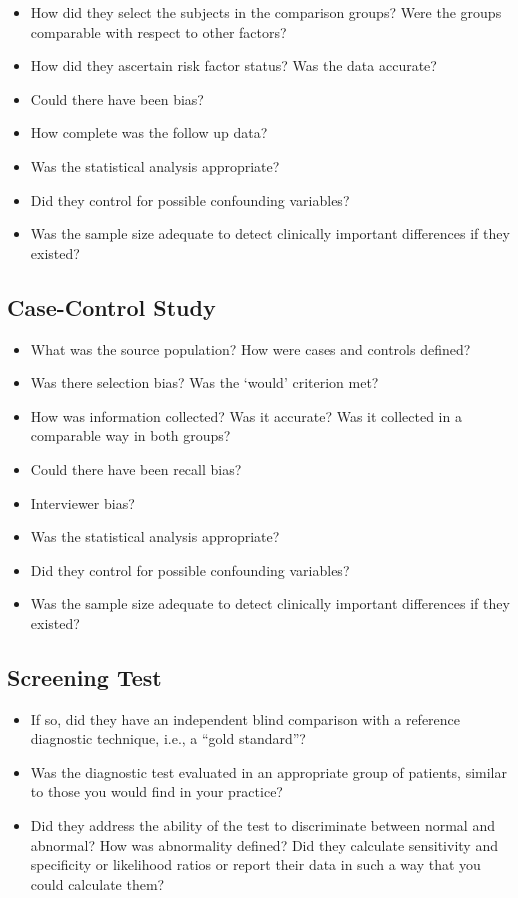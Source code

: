 \documentclass[
]{book}
\providecommand{\tightlist}{%
  \setlength{\itemsep}{0pt}\setlength{\parskip}{0pt}}
\begin{document}
\begin{itemize}
\tightlist
\item
  How did they select the subjects in the comparison groups? Were the groups comparable with respect to other factors?
\item
  How did they ascertain risk factor status? Was the data accurate?
\item
  Could there have been bias?
\item
  How complete was the follow up data?
\item
  Was the statistical analysis appropriate?
\item
  Did they control for possible confounding variables?
\item
  Was the sample size adequate to detect clinically important differences if they existed?
\end{itemize}

\hypertarget{case-control-study}{%
\subsection{Case-Control Study}\label{case-control-study}}

\begin{itemize}
\tightlist
\item
  What was the source population? How were cases and controls defined?
\item
  Was there selection bias? Was the `would' criterion met?
\item
  How was information collected? Was it accurate? Was it collected in a comparable way in both groups?
\item
  Could there have been recall bias?
\item
  Interviewer bias?
\item
  Was the statistical analysis appropriate?
\item
  Did they control for possible confounding variables?
\item
  Was the sample size adequate to detect clinically important differences if they existed?
\end{itemize}

\hypertarget{screening-test}{%
\subsection{Screening Test}\label{screening-test}}

\begin{itemize}
\tightlist
\item
  If so, did they have an independent blind comparison with a reference diagnostic technique, i.e., a ``gold standard''?
\item
  Was the diagnostic test evaluated in an appropriate group of patients, similar to those you would find in your practice?
\item
  Did they address the ability of the test to discriminate between normal and abnormal? How was abnormality defined? Did they calculate sensitivity and specificity or likelihood ratios or report their data in such a way that you could calculate them?
\end{itemize}
\end{document}
